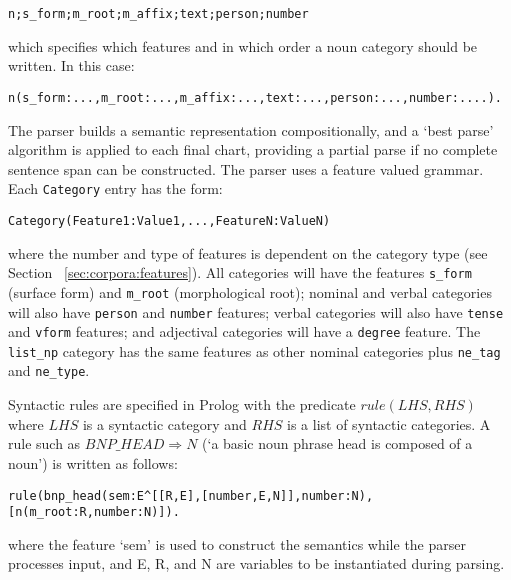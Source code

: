 \begin{small}\begin{verbatim}
n;s_form;m_root;m_affix;text;person;number
\end{verbatim}\end{small}


which specifies which features and in which order a noun category
should be written. In this case:

\begin{small}\begin{verbatim}
n(s_form:...,m_root:...,m_affix:...,text:...,person:...,number:....).
\end{verbatim}\end{small}


The parser builds a semantic representation compositionally, and a `best parse'
algorithm is applied to each final chart, providing a partial parse if no
complete sentence span can be constructed. The parser uses a feature valued
grammar. Each \texttt{Category} entry has the form:
\begin{small}\begin{verbatim}
Category(Feature1:Value1,...,FeatureN:ValueN)
\end{verbatim}\end{small}
where the number and type of features is dependent on the category
type (see Section ~\ref{sec:corpora:features}).  All categories will have the features \texttt{s\_form} (surface
form) and \texttt{m\_root} (morphological root); nominal and verbal
categories will also have \texttt{person} and \texttt{number}
features; verbal categories will also have \texttt{tense} and
\texttt{vform} features; and adjectival categories will have a
\texttt{degree} feature.  The \texttt{list\_np} category has the same
features as other nominal categories plus \texttt{ne\_tag} and
\texttt{ne\_type}.

Syntactic rules are specified in Prolog with the predicate
$rule(LHS,RHS)$ where $LHS$ is a syntactic category and
$RHS$ is a list of syntactic categories. A rule such as $BNP\_HEAD
\Rightarrow N$ (`a basic noun phrase head is composed of a noun') is
written as follows:

\begin{small}\begin{verbatim}
rule(bnp_head(sem:E^[[R,E],[number,E,N]],number:N),
[n(m_root:R,number:N)]).
\end{verbatim}\end{small}
where the feature `sem' is used to construct the semantics while the parser
processes input, and E, R, and N are variables to be instantiated during parsing.

